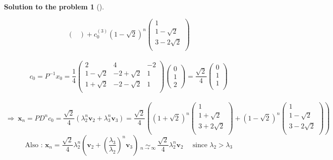 \documentclass[12pt,a4]{article}
\newtheorem{solution}{Solution to the problem}
\newcommand{\bv}{{\mathbf v}}
\newcommand{\bx}{{\mathbf x}}
\begin{document}
{\begin{solution}[]
\begin{enumerate}[(a)]
\[\begin{pmatrix}
\end{pmatrix} +
c_0^{(3)} (1-\sqrt2)^n 
\begin{pmatrix}
1 \\ 1-\sqrt2 \\ 3-2\sqrt2\\
\end{pmatrix}
\]\\
\[
c_0 = P^{-1}x_0 = 
\frac14
\begin{pmatrix}
2 & 4 & -2\\
1-\sqrt2 & -2+\sqrt2 & 1\\
1+\sqrt2 & -2-\sqrt2 & 1\\
\end{pmatrix}
\begin{pmatrix}
0 \\ 1 \\ 2
\end{pmatrix}
=
\frac{\sqrt2}4
\begin{pmatrix}
0\\ 1\\ 1\\
\end{pmatrix}
\]\\
\[
~\Rightarrow~
\bx_n = PD^nc_0 =
\frac{\sqrt2}4
(\lambda_2^n \bv_2 + \lambda_3^n \bv_3) =
\frac{\sqrt2}4
\left(
(1+\sqrt2)^n 
\begin{pmatrix}
1 \\ 1+\sqrt2 \\ 3+2\sqrt2\\
\end{pmatrix}
+ 
(1-\sqrt2)^n 
\begin{pmatrix}
1 \\ 1-\sqrt2 \\ 3-2\sqrt2\\
\end{pmatrix}
\right)
\]
\[
\text{Also : }
\bx_n=
\frac{\sqrt2}4
\lambda_2^n \left(\bv_2 + \left(\frac{\lambda_3}{\lambda_2}\right)^n \bv_3\right)
~\underset{n\to\infty}{\sim}~
\frac{\sqrt2}4 \lambda_2^n \bv_2
\quad \text{ since } \lambda_2 > \lambda_3
\]\\
\end{enumerate}
\end{solution}
}
\end{document}

